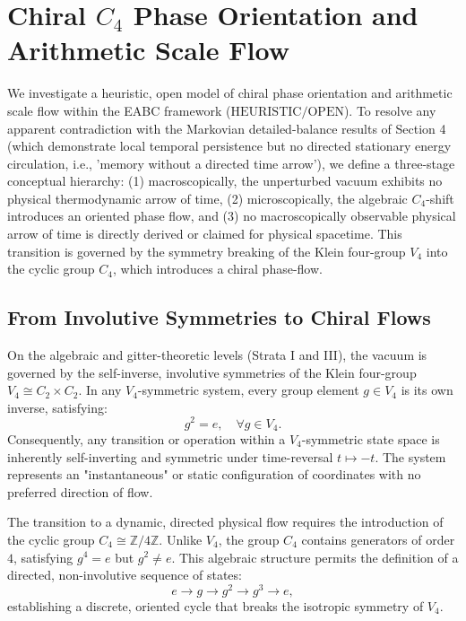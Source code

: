 \documentclass[11pt,a4paper]{article}
\theoremstyle{definition}
\begin{document}
	
	\section{Chiral $C_4$ Phase Orientation and Arithmetic Scale Flow}
	\label{sec:emergent_time_c4}
	
	We investigate a heuristic, open model of chiral phase orientation and arithmetic scale flow within the EABC framework ($\mathrm{HEURISTIC / OPEN}$). To resolve any apparent contradiction with the Markovian detailed-balance results of Section 4 (which demonstrate local temporal persistence but no directed stationary energy circulation, i.e., 'memory without a directed time arrow'), we define a three-stage conceptual hierarchy: (1) macroscopically, the unperturbed vacuum exhibits no physical thermodynamic arrow of time, (2) microscopically, the algebraic $C_4$-shift introduces an oriented phase flow, and (3) no macroscopically observable physical arrow of time is directly derived or claimed for physical spacetime. This transition is governed by the symmetry breaking of the Klein four-group $V_4$ into the cyclic group $C_4$, which introduces a chiral phase-flow.
	
	\subsection{From Involutive Symmetries to Chiral Flows}
	On the algebraic and gitter-theoretic levels (Strata I and III), the vacuum is governed by the self-inverse, involutive symmetries of the Klein four-group $V_4 \cong C_2 \times C_2$. In any $V_4$-symmetric system, every group element $g \in V_4$ is its own inverse, satisfying:
	\begin{equation}
		g^2 = e, \quad \forall g \in V_4.
	\end{equation}
	Consequently, any transition or operation within a $V_4$-symmetric state space is inherently self-inverting and symmetric under time-reversal $t \mapsto -t$. The system represents an "instantaneous" or static configuration of coordinates with no preferred direction of flow.
	
	The transition to a dynamic, directed physical flow requires the introduction of the cyclic group $C_4 \cong \mathbb{Z}/4\mathbb{Z}$. Unlike $V_4$, the group $C_4$ contains generators of order $4$, satisfying $g^4 = e$ but $g^2 \neq e$. This algebraic structure permits the definition of a directed, non-involutive sequence of states:
	\begin{equation}
		e \longrightarrow g \longrightarrow g^2 \longrightarrow g^3 \longrightarrow e,
	\end{equation}
	establishing a discrete, oriented cycle that breaks the isotropic symmetry of $V_4$.
	
\end{document}
